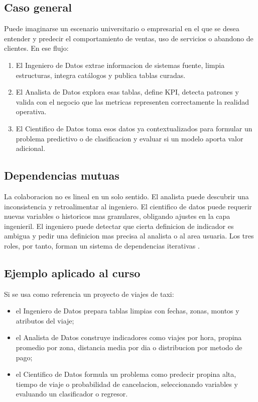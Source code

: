 \documentclass[12pt]{article}
\begin{document}
\subsection{Caso general}
Puede imaginarse un escenario universitario o empresarial en el que se desea entender y predecir el comportamiento de ventas, uso de servicios o abandono de clientes. En ese flujo:
\begin{enumerate}[label=\textbf{F\arabic*.}, leftmargin=*]
\item El Ingeniero de Datos extrae informacion de sistemas fuente, limpia estructuras, integra catálogos y publica tablas curadas.
\item El Analista de Datos explora esas tablas, define KPI, detecta patrones y valida con el negocio que las metricas representen correctamente la realidad operativa.
\item El Cientifico de Datos toma esos datos ya contextualizados para formular un problema predictivo o de clasificacion y evaluar si un modelo aporta valor adicional.
\end{enumerate}

\subsection{Dependencias mutuas}
La colaboracion no es lineal en un solo sentido. El analista puede descubrir una inconsistencia y retroalimentar al ingeniero. El cientifico de datos puede requerir nuevas variables o historicos mas granulares, obligando ajustes en la capa ingenieril. El ingeniero puede detectar que cierta definicion de indicador es ambigua y pedir una definicion mas precisa al analista o al area usuaria. Los tres roles, por tanto, forman un sistema de dependencias iterativas \cite{ibm_modern_team,crispdm}.

\subsection{Ejemplo aplicado al curso}
Si se usa como referencia un proyecto de viajes de taxi:
\begin{itemize}[leftmargin=*]
\item el Ingeniero de Datos prepara tablas limpias con fechas, zonas, montos y atributos del viaje;
\item el Analista de Datos construye indicadores como viajes por hora, propina promedio por zona, distancia media por dia o distribucion por metodo de pago;
\item el Cientifico de Datos formula un problema como predecir propina alta, tiempo de viaje o probabilidad de cancelacion, seleccionando variables y evaluando un clasificador o regresor.
\end{itemize}
\end{document}
